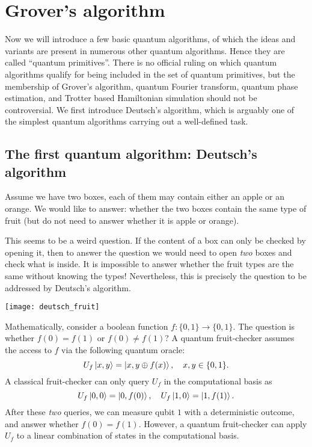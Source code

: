 \chapter{Grover's algorithm}


Now we will introduce a few basic quantum algorithms, of which the ideas and variants are present in numerous other quantum algorithms. 
Hence they are called ``quantum primitives''.
There is no official ruling on which quantum algorithms qualify for being included in the set of quantum primitives, but the membership of Grover's algorithm, quantum Fourier transform,  quantum phase estimation, and Trotter based Hamiltonian simulation should not be controversial. We first introduce Deutsch's algorithm, which is arguably one of the simplest quantum algorithms carrying out a well-defined task.

\section{The first quantum algorithm: Deutsch's algorithm}

Assume we have two boxes, each of them may contain either an apple or an orange.
We would like to answer: whether the two boxes contain the same type of fruit (but do not need to answer whether it is apple or orange).

This seems to be a weird question. 
If the content of a box can only be checked by opening it, then to answer the question we would need to open \emph{two} boxes and check what is inside.
It is impossible to answer whether the fruit types are the same without knowing the types! 
Nevertheless, this is precisely the question to be addressed by Deutsch's algorithm.


\begin{center}
\texttt{[image: deutsch\_fruit]}
\end{center}

Mathematically, consider a boolean function $f:\{0,1\}\to\{0,1\}$. 
The question is whether $f(0)=f(1)$ or $f(0)\ne f(1)$?
A quantum fruit-checker assumes the access to $f$ via the following quantum oracle:
\begin{equation}
U_f\ket{x,y}=\ket{x,y\oplus f(x)}, \quad x,y\in \{0,1\}.
\label{eqn:deutsch_oracle}
\end{equation}
A classical fruit-checker can only query $U_f$ in the computational basis as
\begin{equation}\label{eqn:deutsch_computationalbasis}
U_f\ket{0,0}=\ket{0,f(0)},\quad U_f\ket{1,0}=\ket{1,f(1)}.
\end{equation}
After these \emph{two} queries, we can measure qubit $1$ with a deterministic outcome, and answer whether $f(0)=f(1)$. However, a quantum fruit-checker can apply $U_f$ to a linear combination of states in the computational basis.

